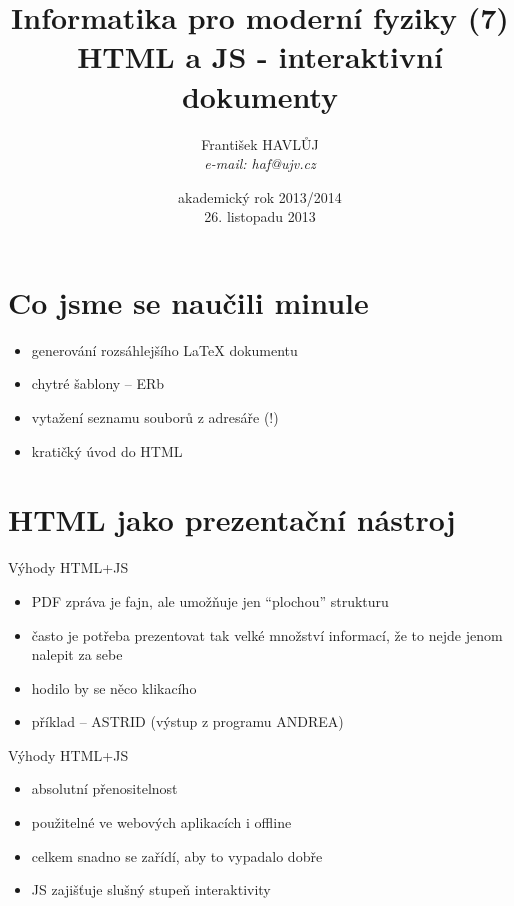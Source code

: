 \documentclass{beamer}
\title[IMF (6)]{Informatika pro moderní fyziky (7)\\ HTML a JS - interaktivní dokumenty}
\author[Franti\v{s}ek HAVL\r{U}J, ORF ÚJV Řež]{Franti\v{s}ek HAVL\r{U}J\\{\scriptsize \emph{e-mail: haf@ujv.cz}}}
\date{akademický rok 2013/2014\\26. listopadu 2013}
\institute[ORF ÚJV Řež]
{ÚJV Řež\\oddělení Reaktorové fyziky a podpory palivového cyklu}
\begin{document}
\begin{frame}
  \titlepage
\end{frame}

\begin{frame}
  \tableofcontents
\end{frame}

\section{Co jsme se naučili minule}

\begin{frame}{}
  \begin{itemize}
    \item generování rozsáhlejšího LaTeX dokumentu
    \item chytré šablony -- ERb
    \item vytažení seznamu souborů z adresáře (!)
    \item kratičký úvod do HTML
  \end{itemize}
\end{frame}

\section{HTML jako prezentační nástroj}

\begin{frame}{Výhody HTML+JS}
  \begin{itemize}
    \item PDF zpráva je fajn, ale umožňuje jen ``plochou'' strukturu
    \item často je potřeba prezentovat tak velké množství informací, že to nejde jenom nalepit za sebe
    \item hodilo by se něco klikacího
    \item příklad -- ASTRID (výstup z programu ANDREA)
  \end{itemize}
\end{frame}

\begin{frame}{Výhody HTML+JS}
  \begin{itemize}
    \item absolutní přenositelnost
    \item použitelné ve webových aplikacích i offline
    \item celkem snadno se zařídí, aby to vypadalo dobře
    \item JS zajišťuje slušný stupeň interaktivity
  \end{itemize}
\end{frame}
\end{document}
